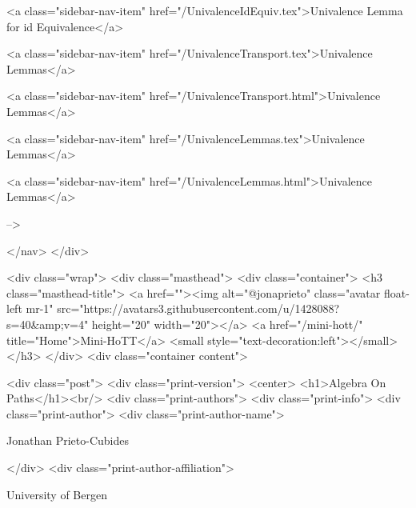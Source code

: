       
    
      
        
          <a class="sidebar-nav-item" href="/UnivalenceIdEquiv.tex">Univalence Lemma for id Equivalence</a>
        
      
    
      
        
          <a class="sidebar-nav-item" href="/UnivalenceTransport.tex">Univalence Lemmas</a>
        
      
    
      
        
          <a class="sidebar-nav-item" href="/UnivalenceTransport.html">Univalence Lemmas</a>
        
      
    
      
        
          <a class="sidebar-nav-item" href="/UnivalenceLemmas.tex">Univalence Lemmas</a>
        
      
    
      
        
          <a class="sidebar-nav-item" href="/UnivalenceLemmas.html">Univalence Lemmas</a>
        
      
     -->

  </nav>
</div>

    <div class="wrap">
      <div class="masthead">
        <div class="container">
          <h3 class="masthead-title">
            <a href=""><img alt="@jonaprieto" class="avatar float-left mr-1" src="https://avatars3.githubusercontent.com/u/1428088?s=40&amp;v=4" height="20" width="20"></a>
            <a href="/mini-hott/" title="Home">Mini-HoTT</a>
            <small style="text-decoration:left"></small>
          </h3>
        </div>
      <div class="container content">
        







<div class="post">
  <div class="print-version">
    <center>
      <h1>Algebra On Paths</h1><br/>
        <div class="print-authors">
          <div class="print-info">
            <div class="print-author">
              <div class="print-author-name">
                
                  Jonathan Prieto-Cubides
                
              </div>
              <div class="print-author-affiliation">
                
                  University of Bergen
                
